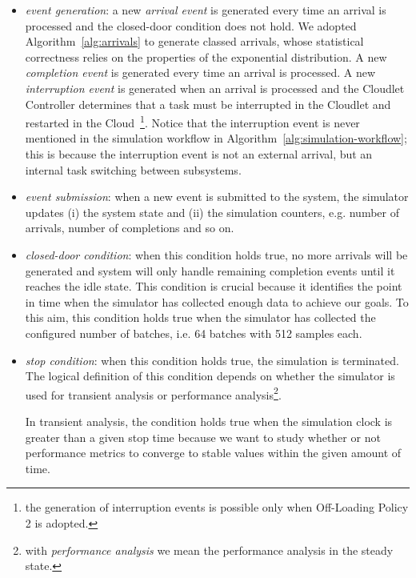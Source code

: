 \begin{itemize}
	
	\item \textit{event generation}: a new \textit{arrival event} is generated every time an arrival is processed and the closed-door condition does not hold. We adopted Algorithm~\ref{alg:arrivals} to generate classed arrivals, whose statistical correctness relies on the properties of the exponential distribution.
	A new \textit{completion event} is generated every time an arrival is processed.
	A new \textit{interruption event} is generated when an arrival is processed and the Cloudlet Controller determines that a task must be interrupted in the Cloudlet and restarted in the Cloud~\footnote{the generation of interruption events is possible only when Off-Loading Policy 2 is adopted.}.
	Notice that the interruption event is never mentioned in the simulation workflow in Algorithm~\ref{alg:simulation-workflow}; this is because the interruption event is not an external arrival, but an internal task switching between subsystems.
	
	\item \textit{event submission}: when a new event is submitted to the system, the simulator updates (i) the system state and (ii) the simulation counters, e.g. number of arrivals, number of completions and so on.
	
	\item \textit{closed-door condition}: when this condition holds true, no more arrivals will be generated and system will only handle remaining completion events until it reaches the idle state. 
	This condition is crucial because it identifies the point in time when the simulator has collected enough data to achieve our goals. 
	To this aim, this condition holds true when the simulator has collected the configured number of batches, i.e. 64 batches with 512 samples each.
	
	\item \textit{stop condition}: when this condition holds true, the simulation is terminated. The logical definition of this condition depends on whether the simulator is used for transient analysis or performance analysis\footnote{with \textit{performance analysis} we mean the performance analysis in the steady state.}.
	
	In transient analysis, the condition holds true when the simulation clock is greater than a given stop time because we want to study whether or not performance metrics to converge to stable values within the given amount of time.
	

\end{itemize}

